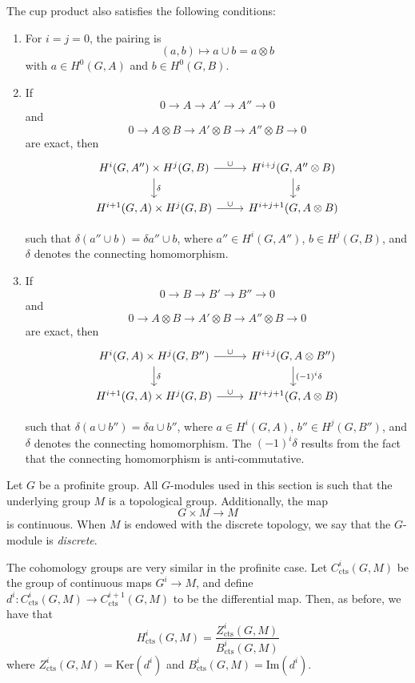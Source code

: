 \documentclass[a4paper, 12pt,oneside,openany]{book}
\begin{document}
The cup product also satisfies the following conditions:
\begin{enumerate}
	\item For $i=j=0$, the pairing is $$(a, b) \mapsto a \cup b = a \otimes b$$ with $a \in H^0(G, A)$ and $b \in H^0(G, B)$. 
	\item If $$0 \to A \to A' \to A'' \to 0$$ and $$0 \to A\otimes B \to A'\otimes B \to A''\otimes B \to 0$$ are exact, then 
	\[
\begin{tikzcd}
H^i(G, A'') \times H^j(G, B) \arrow{r}{\cup}\arrow{d}{\delta} &H^{i+j}(G, A'' \otimes B) \arrow{d}{\delta}\\
H^{i+1}(G, A) \times H^j(G, B) \arrow{r}{\cup} &H^{i+j+1}(G, A \otimes B)
\end{tikzcd}
\]

such that $\delta(a'' \cup b) = \delta a'' \cup b$, where $a'' \in H^i(G, A'')$, $b \in H^j(G, B)$, and $\delta$ denotes the connecting homomorphism.
	\item If $$0 \to B \to B' \to B'' \to 0$$ and $$0 \to A\otimes B \to A'\otimes B \to A''\otimes B \to 0$$ are exact, then 
	\[
\begin{tikzcd}
H^i(G, A) \times H^j(G, B'') \arrow{r}{\cup}\arrow{d}{\delta} &H^{i+j}(G, A \otimes B'') \arrow{d}{(-1)^i \delta}\\
H^{i+1}(G, A) \times H^j(G, B) \arrow{r}{\cup} &H^{i+j+1}(G, A \otimes B)
\end{tikzcd}
\]

such that $\delta(a \cup b'') = \delta a \cup b''$, where $a \in H^i(G, A)$, $b'' \in H^j(G, B'')$, and $\delta$ denotes the connecting homomorphism. The $(-1)^i \delta$ results from the fact that the connecting homomorphism is anti-commutative.

\end{enumerate}

Let $G$ be a profinite group. All $G$-modules used in this section is such that the underlying group $M$ is a topological group. Additionally, the map $$G\times M \to M$$ is continuous. When $M$ is endowed with the discrete topology, we say that the $G$-module is \emph{discrete}. 

The cohomology groups are very similar in the profinite case. Let $C^i_{\text{cts}}(G, M)$ be the group of continuous maps $G^i \to M$, and define $d^i: C^i_{\text{cts}}(G, M) \to C^{i+1}_{\text{cts}}(G, M)$ to be the differential map. Then, as before, we have that $$H^i_{\text{cts}}(G, M) = \frac{Z^i_{\text{cts}}(G, M)}{B^i_{\text{cts}}(G, M)}$$ where $Z^i_{\text{cts}}(G, M) = \text{Ker}(d^i)$ and $B^i_{\text{cts}}(G, M) = \text{Im}(d^i)$.
\end{document}

